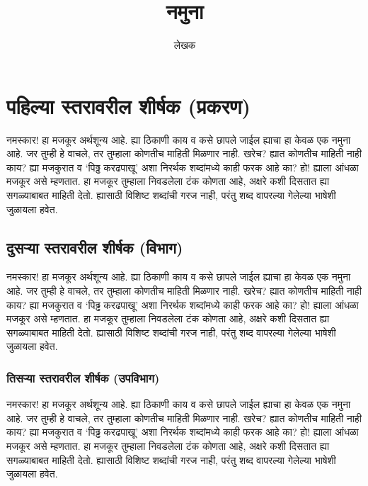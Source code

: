\title{नमुना}
\author{लेखक}

\maketitle

\tableofcontents

\chapter{पहिल्या स्तरावरील शीर्षक (प्रकरण)}

नमस्कार! हा मजकूर अर्थशून्य आहे. ह्या ठिकाणी काय व कसे छापले जाईल ह्याचा हा केवळ एक नमुना
आहे. जर तुम्ही हे वाचले, तर तुम्हाला कोणतीच माहिती मिळणार नाही. खरेच? ह्यात कोणतीच माहिती
नाही काय? ह्या मजकुरात व `पिढ्ढ करढपाखू' अशा निरर्थक शब्दांमध्ये काही फरक आहे का? हो!
ह्याला आंधळा मजकूर असे म्हणतात. हा मजकूर तुम्हाला निवडलेला टंक कोणता आहे, अक्षरे कशी दिसतात
ह्या सगळ्याबाबत माहिती देतो. ह्यासाठी विशिष्ट शब्दांची गरज नाही, परंतु शब्द वापरल्या गेलेल्या
भाषेशी जुळायला हवेत.

\section{दुसऱ्या स्तरावरील शीर्षक (विभाग)}

नमस्कार! हा मजकूर अर्थशून्य आहे. ह्या ठिकाणी काय व कसे छापले जाईल ह्याचा हा केवळ एक नमुना
आहे. जर तुम्ही हे वाचले, तर तुम्हाला कोणतीच माहिती मिळणार नाही. खरेच? ह्यात कोणतीच माहिती
नाही काय? ह्या मजकुरात व `पिढ्ढ करढपाखू' अशा निरर्थक शब्दांमध्ये काही फरक आहे का? हो!
ह्याला आंधळा मजकूर असे म्हणतात. हा मजकूर तुम्हाला निवडलेला टंक कोणता आहे, अक्षरे कशी दिसतात
ह्या सगळ्याबाबत माहिती देतो. ह्यासाठी विशिष्ट शब्दांची गरज नाही, परंतु शब्द वापरल्या गेलेल्या
भाषेशी जुळायला हवेत.

\subsection{तिसऱ्या स्तरावरील शीर्षक (उपविभाग)}

नमस्कार! हा मजकूर अर्थशून्य आहे. ह्या ठिकाणी काय व कसे छापले जाईल ह्याचा हा केवळ एक नमुना
आहे. जर तुम्ही हे वाचले, तर तुम्हाला कोणतीच माहिती मिळणार नाही. खरेच? ह्यात कोणतीच माहिती
नाही काय? ह्या मजकुरात व `पिढ्ढ करढपाखू' अशा निरर्थक शब्दांमध्ये काही फरक आहे का? हो!
ह्याला आंधळा मजकूर असे म्हणतात. हा मजकूर तुम्हाला निवडलेला टंक कोणता आहे, अक्षरे कशी दिसतात
ह्या सगळ्याबाबत माहिती देतो. ह्यासाठी विशिष्ट शब्दांची गरज नाही, परंतु शब्द वापरल्या गेलेल्या
भाषेशी जुळायला हवेत.

